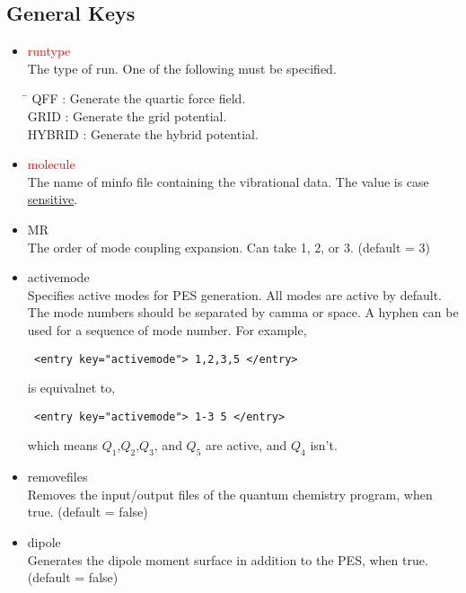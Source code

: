 \documentclass[a4paper,12pt]{article}
\begin{document}
\subsection{General Keys} \label{genKey}
   \begin{itemize}
     \item \textcolor{red}{runtype} \\
      The type of run. One of the following must be specified.
      \begin{tabbing}
         \hspace{20mm} \= \hspace{30mm} \kill
           QFF    \> : Generate the quartic force field.\\
           GRID   \> : Generate the grid potential.\\
           HYBRID \> : Generate the hybrid potential.
      \end{tabbing}      
     \item \textcolor{red}{molecule} \\
       The name of minfo file containing the vibrational data. The value is case \underline{sensitive}.
     \item MR \\
       The order of mode coupling expansion. Can take 1, 2, or 3. (default = 3)
     \item activemode \\
       Specifies active modes for PES generation. All modes are active by
       default. The mode numbers should be separated by camma or space. A hyphen
       can be used for a sequence of mode number. For example,
       \begin{verbatim} <entry key="activemode"> 1,2,3,5 </entry> \end{verbatim}
       is equivalnet to,
       \begin{verbatim} <entry key="activemode"> 1-3 5 </entry> \end{verbatim}
       which means $Q_1$,$Q_2$,$Q_3$, and $Q_5$ are active, and $Q_4$ isn't.
     \item removefiles \\
       Removes the input/output files of the quantum chemistry program, when true. (default = false)
     \item dipole \\
       Generates the dipole moment surface in addition to the PES, when true. (default = false)

\end{itemize}
\end{document}

